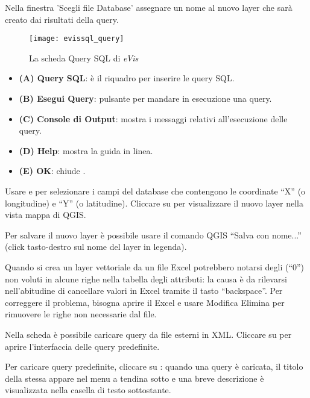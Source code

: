 Nella finestra 'Scegli file Database' assegnare un nome al nuovo layer che sarà creato dai risultati della 
query.

\begin{figure}[ht]
   \centering
   \texttt{[image: evissql\_query]}
   \caption{La scheda Query SQL di \emph{eVis} \wincaption}\label{evissql_query}
\end{figure}

\begin{itemize}[label=--]
\item \textbf{(A) Query SQL}: è il riquadro per inserire le query SQL.
\item \textbf{(B) Esegui Query}: pulsante per mandare in esecuzione una query.
\item \textbf{(C) Console di Output}: mostra i messaggi relativi all'esecuzione delle query.
\item \textbf{(D) Help}: mostra la guida in linea.
\item \textbf{(E) OK}: chiude .
\end{itemize}

Usare  e  per selezionare i campi del database 
che contengono le coordinate ``X'' (o longitudine) e ``Y'' (o latitudine). 
Cliccare su  per visualizzare il nuovo layer nella vista mappa di QGIS.

Per salvare il nuovo layer è possibile usare il comando QGIS ``Salva con nome...'' (click tasto-destro
sul nome del layer in legenda).

\begin{Tip}\caption{\textsc{Creare un layer vettoriale da un foglio di lavoro Microsoft Excel}}
Quando si crea un layer vettoriale da un file Excel potrebbero notarsi degli (``0'') non voluti 
in alcune righe nella tabella degli attributi: la causa è da rilevarsi nell'abitudine di cancellare 
valori in Excel tramite il tasto ``backspace''. Per correggere il problema, bisogna aprire il Excel
e usare Modifica \arrow Elimina per rimuovere le righe non necessarie dal file.
\end{Tip}

\label{evis_predefined}

Nella scheda  è possibile caricare query da file esterni in XML.
Cliccare su  per aprire l'interfaccia delle query predefinite.

Per caricare query predefinite, cliccare su : quando una query è caricata,
il titolo della stessa appare nel menu a tendina sotto  e una breve
descrizione è visualizzata nella casella di testo sottostante.

